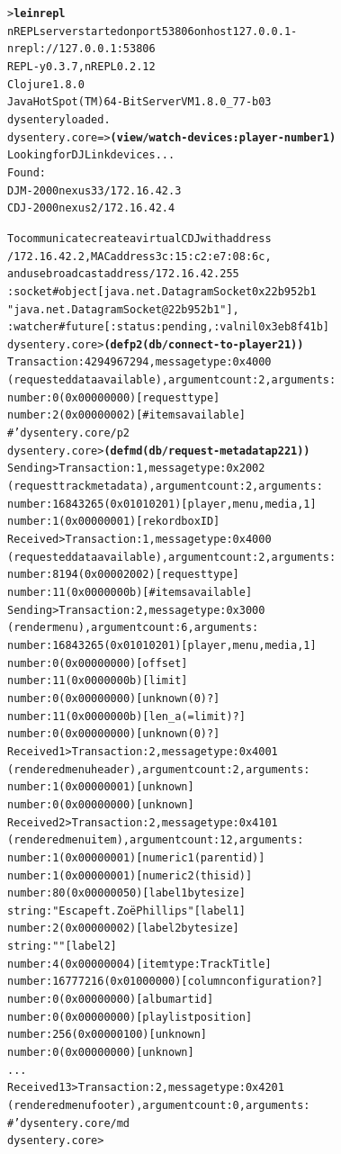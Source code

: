 \documentclass[11pt]{article}
\begin{document}
\begin{footnotesize}\begin{alltt}
> \textbf{lein repl}
nREPL server started on port 53806 on host 127.0.0.1 -
 nrepl://127.0.0.1:53806
REPL-y 0.3.7, nREPL 0.2.12
Clojure 1.8.0
Java HotSpot(TM) 64-Bit Server VM 1.8.0_77-b03
dysentery loaded.
dysentery.core=> \textbf{(view/watch-devices :player-number 1)}
Looking for DJ Link devices...
Found:
   DJM-2000nexus 33 /172.16.42.3
   CDJ-2000nexus 2 /172.16.42.4

To communicate create a virtual CDJ with address
  /172.16.42.2, MAC address 3c:15:c2:e7:08:6c,
  and use broadcast address /172.16.42.255
{:socket #object[java.net.DatagramSocket 0x22b952b1
                 "java.net.DatagramSocket@22b952b1"],
 :watcher #future[{:status :pending, :val nil} 0x3eb8f41b]}
dysentery.core> \textbf{(def p2 (db/connect-to-player 2 1))}
Transaction: 4294967294, message type: 0x4000
 (requested data available), argument count: 2, arguments:
  number:          0 (0x00000000) [request type]
  number:          2 (0x00000002) [# items available]
#'dysentery.core/p2
dysentery.core> \textbf{(def md (db/request-metadata p2 2 1))}
Sending > Transaction: 1, message type: 0x2002
 (request track metadata), argument count: 2, arguments:
  number:   16843265 (0x01010201) [player, menu, media, 1]
  number:          1 (0x00000001) [rekordbox ID]
Received > Transaction: 1, message type: 0x4000
 (requested data available), argument count: 2, arguments:
  number:       8194 (0x00002002) [request type]
  number:         11 (0x0000000b) [# items available]
Sending > Transaction: 2, message type: 0x3000
 (render menu), argument count: 6, arguments:
  number:   16843265 (0x01010201) [player, menu, media, 1]
  number:          0 (0x00000000) [offset]
  number:         11 (0x0000000b) [limit]
  number:          0 (0x00000000) [unknown (0)?]
  number:         11 (0x0000000b) [len_a (= limit)?]
  number:          0 (0x00000000) [unknown (0)?]
Received 1  > Transaction: 2, message type: 0x4001
 (rendered menu header), argument count: 2, arguments:
  number:          1 (0x00000001) [unknown]
  number:          0 (0x00000000) [unknown]
Received 2  > Transaction: 2, message type: 0x4101
 (rendered menu item), argument count: 12, arguments:
  number:          1 (0x00000001) [numeric 1 (parent id)]
  number:          1 (0x00000001) [numeric 2 (this id)]
  number:         80 (0x00000050) [label 1 byte size]
  string: "Escape ft. Zoë Phillips" [label 1]
  number:          2 (0x00000002) [label 2 byte size]
  string: "" [label 2]
  number:          4 (0x00000004) [item type: Track Title]
  number:   16777216 (0x01000000) [column configuration?]
  number:          0 (0x00000000) [album art id]
  number:          0 (0x00000000) [playlist position]
  number:        256 (0x00000100) [unknown]
  number:          0 (0x00000000) [unknown]
...
Received 13  > Transaction: 2, message type: 0x4201
 (rendered menu footer), argument count: 0, arguments:
#'dysentery.core/md
dysentery.core>
\end{alltt}\end{footnotesize}
\end{document}
